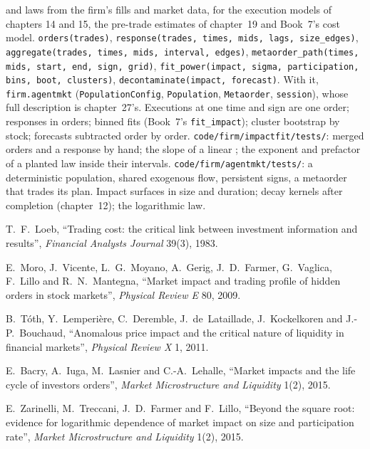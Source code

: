 \begin{build}
  and laws from the firm's fills and market data, for the execution models of chapters 14 and 15, the pre-trade estimates of
chapter~19 and Book~7's cost model.
 \texttt{orders(trades)}, \texttt{response(trades, times, mids, lags, size\_edges)}, \texttt{aggregate(trades, times, mids, interval,
edges)}, \texttt{metaorder\_path(times, mids, start, end, sign, grid)}, \texttt{fit\_power(impact, sigma, participation, bins, boot, clusters)},
\texttt{decontaminate(impact, forecast)}. With it, \texttt{firm.agentmkt} (\texttt{PopulationConfig}, \texttt{Population}, \texttt{Metaorder},
\texttt{session}), whose full description is chapter~27's.
 Executions at one time and sign are one order; responses in orders; binned fits (Book~7's \texttt{fit\_impact}); cluster bootstrap by
stock; forecasts subtracted order by order.
 \texttt{code/firm/impactfit/tests/}: merged orders and a response by hand; the slope of a linear ; the exponent
and prefactor of a planted law inside their intervals. \texttt{code/firm/agentmkt/tests/}: a deterministic population, shared exogenous flow, persistent
signs, a metaorder that trades its plan.
 Impact surfaces in size and duration; decay kernels after completion (chapter~12); the logarithmic law.
\end{build}

\begin{omsources}
\item T.~F.~Loeb, ``Trading cost: the critical link between investment information and results'', \emph{Financial Analysts Journal} 39(3), 1983.
\item E.~Moro, J.~Vicente, L.~G.~Moyano, A.~Gerig, J.~D.~Farmer, G.~Vaglica, F.~Lillo and R.~N.~Mantegna, ``Market impact and trading profile of hidden
orders in stock markets'', \emph{Physical Review E} 80, 2009.
\item B.~T\'oth, Y.~Lemperi\`ere, C.~Deremble, J.~de~Lataillade, J.~Kockelkoren and J.-P.~Bouchaud, ``Anomalous price impact and the critical nature of
liquidity in financial markets'', \emph{Physical Review X} 1, 2011.
\item E.~Bacry, A.~Iuga, M.~Lasnier and C.-A.~Lehalle, ``Market impacts and the life cycle of investors orders'', \emph{Market Microstructure and
Liquidity} 1(2), 2015.
\item E.~Zarinelli, M.~Treccani, J.~D.~Farmer and F.~Lillo, ``Beyond the square root: evidence for logarithmic dependence of market impact on size and
participation rate'', \emph{Market Microstructure and Liquidity} 1(2), 2015.
\end{omsources}

